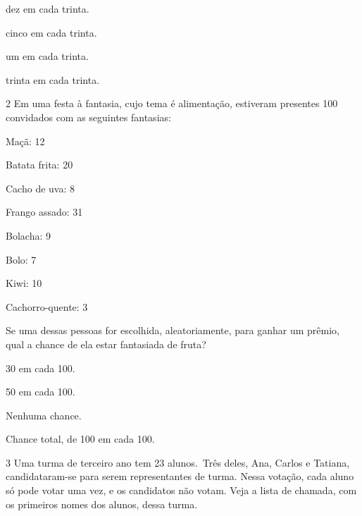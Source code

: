 \begin{escolha}
\item
  dez em cada trinta.
\item
  cinco em cada trinta.
\item
  um em cada trinta.
\item
  trinta em cada trinta.
\end{escolha}


\num{2} Em uma festa à fantasia, cujo tema é alimentação, estiveram presentes  100 convidados com as seguintes fantasias:

\begin{myquote}
\begin{itemize}
  \begin{multicols}{2}
\item [] Maçã: 12
\item [] Batata frita: 20
\item [] Cacho de uva: 8
\item [] Frango assado: 31
\item [] Bolacha: 9
\item [] Bolo: 7
\item [] Kiwi: 10
\item [] Cachorro-quente: 3
  \end{multicols}
\end{itemize}
\end{myquote}

Se uma dessas pessoas for escolhida, aleatoriamente, para ganhar um prêmio, qual a chance de ela estar fantasiada de fruta?

\begin{escolha}
\item
30 em cada 100.
\item
50 em cada 100.
\item
Nenhuma chance.
\item
Chance total, de 100 em cada 100.
\end{escolha}


\num{3} Uma turma de terceiro ano tem 23 alunos.~Três deles, Ana, Carlos e Tatiana, candidataram-se para serem representantes de turma. Nessa votação, cada aluno só pode votar uma vez, e os candidatos não votam. Veja a lista de chamada, com os primeiros nomes dos alunos, dessa turma.

